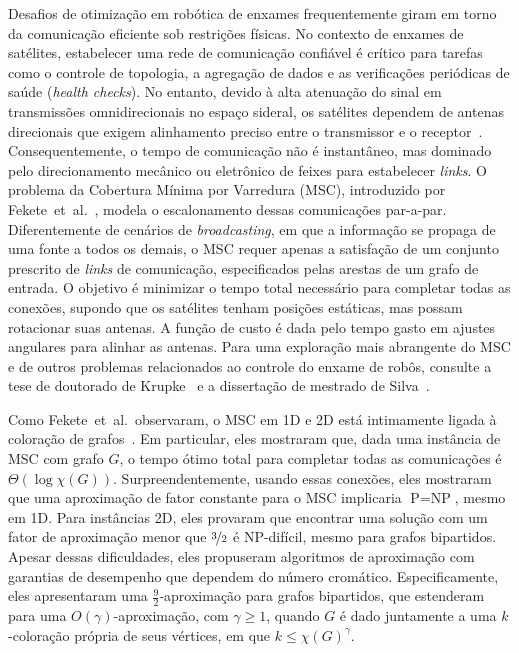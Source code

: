 \documentclass[12pt]{article}
\begin{document}
Desafios de otimização em robótica de enxames frequentemente giram em torno da comunicação eficiente sob restrições físicas.
%
No contexto de enxames de satélites, estabelecer uma rede de comunicação confiável é crítico para tarefas como o controle de topologia, a agregação de dados e as verificações periódicas de saúde (\emph{health checks}).
%
No entanto, devido à alta atenuação do sinal em transmissões omnidirecionais no espaço sideral, os satélites dependem de antenas direcionais que exigem alinhamento preciso entre o transmissor e o receptor~\cite{WikiLaser}.
%
Consequentemente, o tempo de comunicação não é instantâneo, mas dominado pelo direcionamento mecânico ou eletrônico de feixes para estabelecer \emph{links}.
%
O problema da Cobertura Mínima por Varredura (MSC), introduzido por Fekete~et~al.~\cite{Fe21}, modela o escalonamento dessas comunicações par-a-par.
%
Diferentemente de cenários de \emph{broadcasting}, em que a informação se propaga de uma fonte a todos os demais, o MSC requer apenas a satisfação de um conjunto prescrito de \emph{links} de comunicação, especificados pelas arestas de um grafo de entrada.
%
O objetivo é minimizar o tempo total necessário para completar todas as conexões, supondo que os satélites tenham posições estáticas, mas possam rotacionar suas antenas.
%
A função de custo é dada pelo tempo gasto em ajustes angulares para alinhar as antenas.
%
Para uma exploração mais abrangente do MSC e de outros problemas relacionados ao controle do enxame de robôs, consulte a tese de doutorado de Krupke~\cite{Kru22} e a dissertação de mestrado de Silva~\cite{Lu25}.

Como Fekete~et~al.~observaram, o MSC em 1D e 2D está intimamente ligada à coloração de grafos~\cite{Fe21}.
%
Em particular, eles mostraram que, dada uma instância de MSC com grafo $G$, o tempo ótimo total para completar todas as comunicações é $\Theta(\log{\chi(G)})$.
%
Surpreendentemente, usando essas conexões, eles mostraram que uma aproximação de fator constante para o MSC implicaria $\text{P} = \text{NP}$, mesmo em 1D. Para instâncias 2D, eles provaram que encontrar uma solução com um fator de aproximação menor que $\nicefrac{3}{2}$ é NP-difícil, mesmo para grafos bipartidos.
%
Apesar dessas dificuldades, eles propuseram algoritmos de aproximação com garantias de desempenho que dependem do número cromático.
%
Especificamente, eles apresentaram uma \mbox{$\frac{9}{2}$-aproximação} para grafos bipartidos, que estenderam para uma \mbox{$O(\gamma)$-aproximação}, com $\gamma \ge 1$, quando $G$ é dado juntamente a uma $k$-coloração própria de seus vértices, em que $k \leq \chi(G)^\gamma$.
\end{document}
